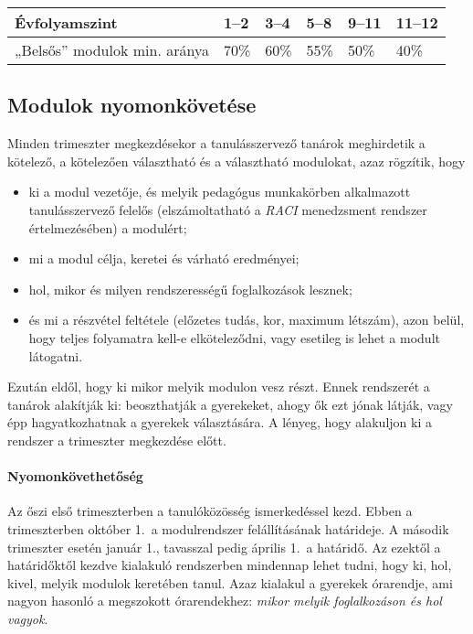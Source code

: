 \begin{longtable}[]{@{}llllll@{}}
\toprule
Évfolyamszint & 1--2 & 3--4 & 5--8 & 9--11 & 11--12\tabularnewline
\midrule
\endhead
„Belsős'' modulok min. aránya & 70\% & 60\% & 55\% & 50\% &
40\%\tabularnewline
\bottomrule
\end{longtable}

\hypertarget{modulok-nyomonkovetese}{%
\subsection{Modulok nyomonkövetése}\label{modulok-nyomonkovetese}}

Minden trimeszter megkezdésekor a tanulásszervező tanárok meghirdetik a
kötelező, a kötelezően választható és a választható modulokat, azaz
rögzítik, hogy

\begin{itemize}
\tightlist
\item
  ki a modul vezetője, és melyik pedagógus munkakörben alkalmazott
  tanulásszervező felelős (elszámoltatható a
  {\emph{RACI}}
  menedzsment
  rendszer értelmezésében) a modulért;
\item
  mi a modul célja, keretei és várható eredményei;
\item
  hol, mikor és milyen rendszerességű foglalkozások lesznek;
\item
  és mi a részvétel feltétele (előzetes tudás, kor, maximum létszám),
  azon belül, hogy teljes folyamatra kell-e
  elköteleződni, vagy esetileg is lehet a modult látogatni.
\end{itemize}

Ezután eldől, hogy ki mikor melyik modulon vesz részt. Ennek rendszerét
a tanárok alakítják ki: beoszthatják a gyerekeket, ahogy ők ezt jónak
látják, vagy épp hagyatkozhatnak a gyerekek választására. A lényeg, hogy
alakuljon ki a rendszer a trimeszter megkezdése előtt.

\hypertarget{nyomonkovethetoseg}{%
\paragraph{Nyomonkövethetőség}\label{nyomonkovethetoseg}}

Az őszi első trimeszterben a tanulóközösség ismerkedéssel kezd. Ebben a
trimeszterben október 1.\ a modulrendszer felállításának határideje. A
második trimeszter esetén január 1., tavasszal pedig április 1.\ a határidő.
Az ezektől a határidőktől kezdve kialakuló rendszerben mindennap lehet
tudni, hogy ki, hol, kivel, melyik modulok keretében tanul. Azaz
kialakul a gyerekek órarendje, ami nagyon hasonló a megszokott
órarendekhez: \emph{mikor melyik foglalkozáson és hol vagyok}.

